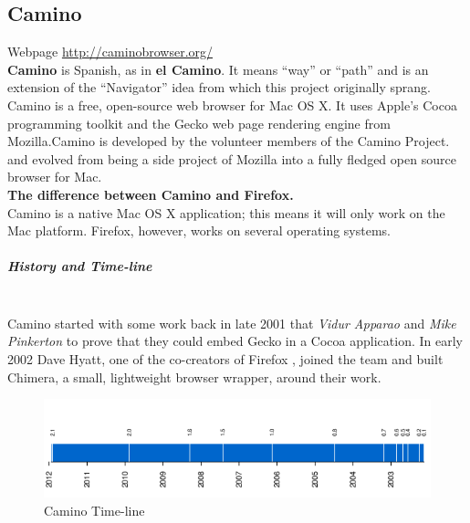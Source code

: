 \documentclass[11pt]{article} %
\begin{document}
\subsection{Camino}
Webpage \url{http://caminobrowser.org/}\\
 \textbf{Camino} is Spanish, as in \textbf{el Camino}. It means “way” or “path” and is an extension of the “Navigator” idea from which this project originally sprang.\\
 Camino is a free, open-source web browser for Mac OS X. It uses Apple’s Cocoa programming toolkit and the Gecko web page rendering engine from Mozilla.Camino is developed by the volunteer members of the Camino Project.
and evolved from being a side project of Mozilla into a fully fledged open source browser for Mac.\\
\textbf{ The difference between Camino and Firefox.} \\
 Camino is a native Mac OS X application; this means it will only work on the Mac platform. Firefox, however, works on several operating systems.
  \subparagraph{History and Time-line} \mbox{} \\
Camino started with some work back in late 2001 that \textit{Vidur Apparao} and \textit{Mike Pinkerton} to prove that they could embed Gecko in a Cocoa application. 
 In early 2002 Dave Hyatt, one of the co-creators of Firefox , joined the team and built Chimera, a small, lightweight browser wrapper, around their work.
       \begin{figure}
   \centering
        \includegraphics[scale=0.6]{./Caminotimeline.png}
     \caption{Camino Time-line}
      \end{figure}
\end{document}
